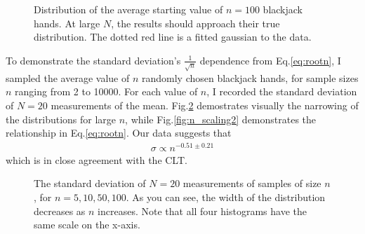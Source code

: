 \documentclass[12pt]{article}
\begin{document}
\begin{figure}[H]
\caption[SODUMB]{Distribution of the average starting value of $n=100$ blackjack hands. At large $N$, the results should approach their true distribution. The dotted red line is a fitted gaussian to the data.}
\label{fig:approachgaussian}
\end{figure}
To demonstrate the standard deviation's $\frac{1}{\sqrt{n}}$ dependence from Eq.\ref{eq:rootn}, I sampled the average value of $n$ randomly chosen blackjack hands, for sample sizes $n$ ranging from 2 to 10000. For each value of $n$, I recorded the standard deviation of $N=20$ measurements of the mean. Fig.\ref{fig:n_scaling} demostrates visually the narrowing of the distributions for large $n$, while Fig.\ref{fig:n_scaling2} demonstrates the relationship in Eq.\ref{eq:rootn}. Our data suggests that
\begin{eqnarray}
\sigma \propto n^{-0.51 \pm 0.21} \nonumber
\end{eqnarray}
which is in close agreement with the CLT.
\begin{figure}[H]
\caption[SODUMB]{The standard deviation of $N=20$ measurements of samples of size $n$, for $n=5,10,50,100$. As you can see, the width of the distribution decreases as $n$ increases. Note that all four histograms have the same scale on the x-axis.}
\label{fig:n_scaling}
\end{figure}
\end{document}
